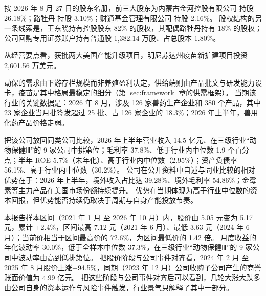 按 2026 年 8 月 27 日的股东名册，前三大股东为内蒙古金河控股有限公司 持股 26.18\%；路牡丹 持股 3.10\%；财通基金管理有限公司 持股 2.16\%。 股权结构的另一条线索是，王东晓持有控股股东 82\% 的股权，其配偶路牡丹持有 18\% 的股权；公司回购专用证券账户持有普通股 1,382.14 万股、占总股本 1.80\%。

 从经营要点看，获批两大美国产能升级项目，明尼苏达州疫苗新扩建项目投资 2,601.56 万美元。

 动保的需求由下游存栏规模而非养殖盈利决定，供给端则由产品批文与研发能力设卡，疫苗是其中格局最稳定的细分（第 \ref{sec:framework} 章的供需框架）。 当期该行业的关键数据是：2026 年 8 月，涉及 126 家兽药生产企业和 380 个产品，其中 23 家企业当月批签发超过 25 批、占 126 家企业的 18.3\%；2026 年上半年，兽用化药产品价格走弱。

 把该公司放回同类公司比较，2026 年上半年营业收入 14.5 亿元、在三级行业“动物保健Ⅲ”的 9 家公司中排第位；毛利率 37.8\%、低于行业内中位数 1.9 个百分点；半年 ROE 5.7\%（未年化）、高于行业内中位数（2.95\%）；资产负债率 56.1\%、高于行业内中位数（30.2\%）。 公司在公开资料中自述与同业比较的相对优势在于：2026 年上半年，境外收入占比达 39.28\%、境外毛利率 54.86\%；金霉素等主力产品在美国市场份额持续提升。 优势在当期体现为高于行业中位数的资本回报，但优势能否持续仍取决于周期与自身产能投放节奏。

 本报告样本区间（2021 年 1 月 至 2026 年 10 月）内，股价由 5.05 元变为 5.17 元，累计 +2.4\%，区间最高 7.12 元（2021 年 6 月）、最低 3.63 元（2024 年 6 月）；当前价相当于区间最高价的 72.6\%，为区间最低价的 1.42 倍。 月度收益的年化波动率 30.0\%，低于全样本中位数 37.3\%，在三级行业“动物保健Ⅲ”的 9 家公司中波动率由高到低排第位。 把股价阶段与公司事件对齐看，2024 年 2 月 至 2025 年 8 月股价上涨+94.5\%，同期（2023 年 12 月）公司收购子公司产生的商誉账面价值为 4.99 亿元。 把这些阶段与公司事件对齐后可以看到，几轮大涨大跌多由公司自身的资本运作与风险事件触发，行业景气只解释了其中一部分。

